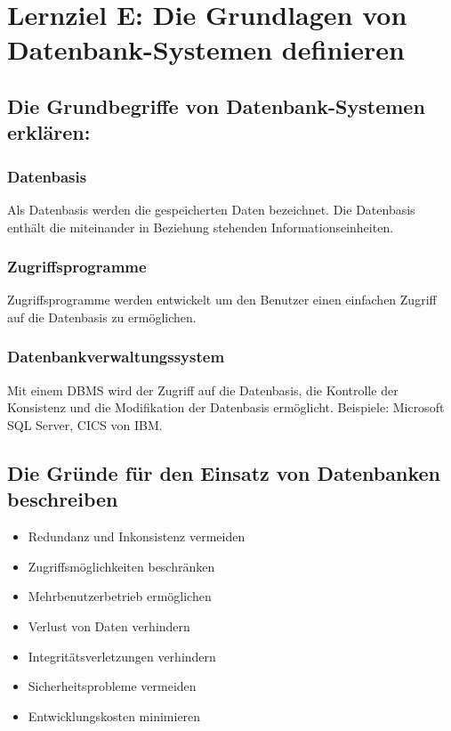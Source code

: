\section{Lernziel E: Die Grundlagen von Datenbank-Systemen definieren}

\subsection{Die Grundbegriffe von Datenbank-Systemen erklären:}

\subsubsection{Datenbasis}

Als Datenbasis werden die gespeicherten Daten bezeichnet. Die Datenbasis enthält die miteinander in Beziehung stehenden Informationseinheiten.

\subsubsection{Zugriffsprogramme} 

Zugriffsprogramme werden entwickelt um den Benutzer einen einfachen Zugriff auf die Datenbasis zu ermöglichen.

\subsubsection{Datenbankverwaltungssystem}

Mit einem \ac{DBMS} wird der Zugriff auf die Datenbasis, die Kontrolle der Konsistenz und die Modifikation der Datenbasis ermöglicht. Beispiele: Microsoft SQL Server, CICS von IBM.

\subsection{Die Gründe für den Einsatz von Datenbanken beschreiben}

\begin{itemize}
	\item Redundanz und Inkonsistenz vermeiden
	\item Zugriffsmöglichkeiten beschränken
	\item Mehrbenutzerbetrieb ermöglichen
	\item Verlust von Daten verhindern
	\item Integritätsverletzungen verhindern
	\item Sicherheitsprobleme vermeiden
	\item Entwicklungskosten minimieren
\end{itemize}

